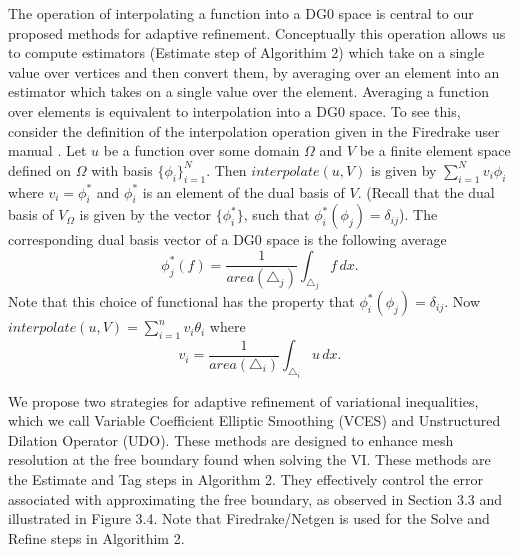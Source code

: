 \documentclass[]{interact}
\theoremstyle{plain}%
\theoremstyle{definition}
\theoremstyle{remark}
\begin{document}
The operation of interpolating a function into a DG0 space is central to our proposed methods for adaptive refinement. Conceptually this operation allows us to compute estimators (Estimate step of Algorithim 2) which take on a single value over vertices and then convert them, by averaging over an element into an estimator which takes on a single value over the element. Averaging a function over elements is equivalent to interpolation into a DG0 space. To see this, consider the definition of the interpolation operation given in the Firedrake user manual \citep{ham_firedrake_2023}. 
Let $u$ be a function over some domain $\Omega$ and $V$ be a finite element space defined on $\Omega$ with basis $\{\phi_i\}_{i = 1}^N$. Then $interpolate(u, V)$ is given by $\sum_{i = 1}^N v_i \phi_i$ where $v_i = \phi^*_i$ and $\phi^*_i$ is an element of the dual basis of $V$. (Recall that the dual basis of $V_\Omega$ is given by the vector $\{\phi^*_i\}$, such that $\phi^*_i(\phi_j) = \delta_{ij}$). The corresponding dual basis vector of a DG0 space is the following average
\begin{equation}
  \phi_j^*(f) = \frac{1}{area(\triangle_j)}\int_{\triangle_j} f\, dx.
\end{equation}
Note that this choice of functional has the property that $\phi^*_i(\phi_j) = \delta_{ij}$. Now $interpolate(u, V) = \sum_{i = 1}^n v_i\theta_i$ where
\begin{equation}
  v_i = \frac{1}{area(\triangle_i)}\int_{\triangle_i} u \, dx.
\end{equation}

We propose two strategies for adaptive refinement of variational inequalities, which we call Variable Coefficient Elliptic Smoothing (VCES) and Unstructured Dilation Operator (UDO). These methods are designed to enhance mesh resolution at the free boundary found when solving the VI. These methods are the Estimate and Tag steps in Algorithm 2. They effectively control the error associated with approximating the free boundary, as observed in Section 3.3 and illustrated in Figure 3.4. Note that Firedrake/Netgen is used for the Solve and Refine steps in Algorithim 2.
\end{document}
